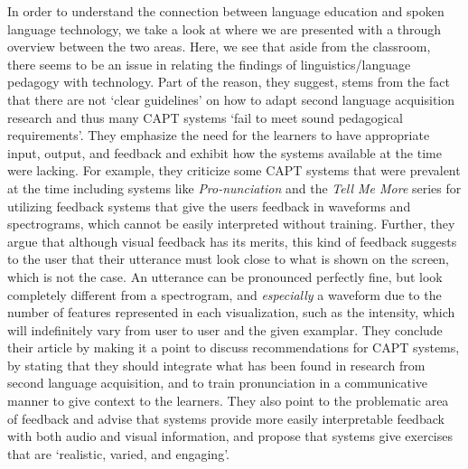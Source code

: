 \documentclass
[
    a4paper,
    twoside,
    12pt,
]
{report}
\begin{document}
In order to understand the connection between language education and
spoken language technology, we take a look at \textcite{neri2002} where
we are presented with a through overview between the two areas. Here, we
see that aside from the classroom, there seems to be an issue in
relating the findings of linguistics/language pedagogy with technology.
Part of the reason, they suggest, stems from the fact that there are not
`clear guidelines' on how to adapt second language acquisition research
and thus many CAPT systems `fail to meet sound pedagogical
requirements'. They emphasize the need for the learners to have
appropriate input, output, and feedback and exhibit how the systems
available at the time were lacking. For example, they criticize some
CAPT systems that were prevalent at the time including systems like
\textit{Pro-nunciation} and the \textit{Tell Me More} series for
utilizing feedback systems that give the users feedback in waveforms and
spectrograms, which cannot be easily interpreted without training.
Further, they argue that although visual feedback has its merits, this
kind of feedback suggests to the user that their utterance must look
close to what is shown on the screen, which is not the case. An
utterance can be pronounced perfectly fine, but look completely
different from a spectrogram, and \textit{especially} a waveform due to
the number of features represented in each visualization, such as the
intensity, which will indefinitely vary from user to user and the given
examplar. They conclude their article by making it a point to discuss
recommendations for CAPT systems, by stating that they should integrate
what has been found in research from second language acquisition, and to
train pronunciation in a communicative manner to give context to the
learners. They also point to the problematic area of feedback and advise
that systems provide more easily interpretable feedback with both audio
and visual information, and propose that systems give exercises that are
`realistic, varied, and engaging'.
\end{document}
